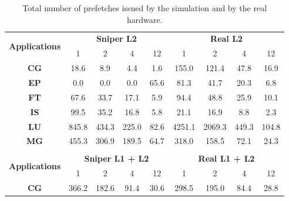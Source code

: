 \documentclass[AMA,final,STIX1COL]{WileyNJD-v2}
\begin{document}
\begin{table}[]\centering
\caption{Total number of prefetches issued by the simulation and by the real hardware.}
\label{table:num_pref}
\begin{tabular}{@{}ccccccccc@{}}
\multicolumn{1}{c|}{\multirow{2}{*}{\textbf{Applications}}} & \multicolumn{4}{c|}{\textbf{Sniper L2}}              & \multicolumn{4}{c}{\textbf{Real L2}}      \\ \cmidrule(l){2-9} 
\multicolumn{1}{c|}{}                                       & 1      & 2      & 4     & \multicolumn{1}{c|}{12}    & 1         & 2        & 4        & 12      \\ \midrule
\multicolumn{1}{c|}{\textbf{CG}}                            & 18.6   & 8.9    & 4.4   & \multicolumn{1}{c|}{1.6}   & 155.0     & 121.4    & 47.8     & 16.9    \\
\multicolumn{1}{c|}{\textbf{EP}}                            & 0.0    & 0.0    & 0.0   & \multicolumn{1}{c|}{65.6}  & 81.3      & 41.7     & 20.3     & 6.8     \\
\multicolumn{1}{c|}{\textbf{FT}}                            & 67.6   & 33.7   & 17.1  & \multicolumn{1}{c|}{5.9}   & 94.4      & 48.8     & 25.9     & 10.1    \\
\multicolumn{1}{c|}{\textbf{IS}}                            & 99.5   & 35.2   & 16.8  & \multicolumn{1}{c|}{5.8}   & 21.1      & 16.9     & 8.8      & 2.3     \\
\multicolumn{1}{c|}{\textbf{LU}}                            & 845.8  & 434.3  & 225.0 & \multicolumn{1}{c|}{82.6}  & 4251.1    & 2069.3   & 449.3    & 104.8   \\
\multicolumn{1}{c|}{\textbf{MG}}                            & 455.3  & 306.9  & 189.5 & \multicolumn{1}{c|}{64.7}  & 318.0     & 158.5    & 72.1     & 24.3    \\
                                                            &        &        &       &                            &           &          &          &         \\ \midrule
\multicolumn{1}{c|}{\multirow{2}{*}{\textbf{Applications}}} & \multicolumn{4}{c|}{\textbf{Sniper L1 + L2}}         & \multicolumn{4}{c}{\textbf{Real L1 + L2}} \\ \cmidrule(l){2-9} 
\multicolumn{1}{c|}{}                                       & 1      & 2      & 4     & \multicolumn{1}{c|}{12}    & 1         & 2        & 4        & 12      \\ \cmidrule(l){2-9} 
\multicolumn{1}{c|}{\textbf{CG}}                            & 366.2  & 182.6  & 91.4  & \multicolumn{1}{c|}{30.6}  & 298.5     & 195.0    & 84.4     & 28.8    \\

\end{tabular}
\end{table}
\end{document}

